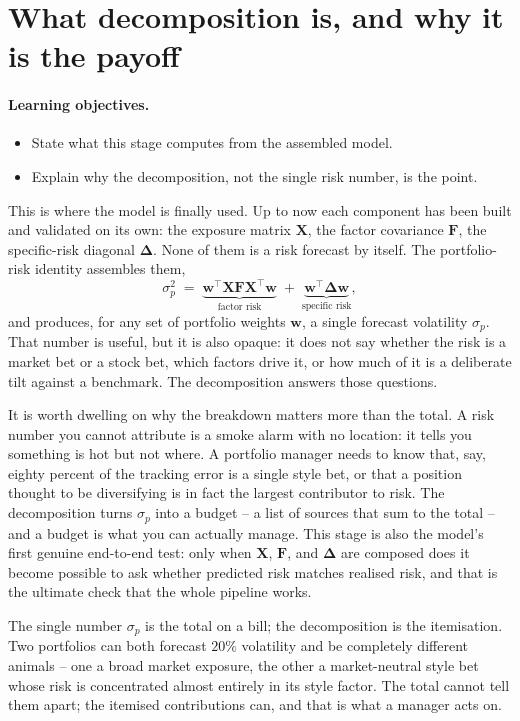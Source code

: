 \documentclass[11pt]{article}
\theoremstyle{definition}
\theoremstyle{plain}
\theoremstyle{remark}
\newcommand{\T}{^{\!\top}}
\newcommand{\wvec}{\mathbf{w}}
\newcommand{\Xmat}{\mathbf{X}}
\newcommand{\Fmat}{\mathbf{F}}
\newcommand{\Del}{\boldsymbol{\Delta}}
\begin{document}
\tableofcontents
\bigskip

\section{What decomposition is, and why it is the payoff}\label{sec:what}

\paragraph{Learning objectives.}
\begin{itemize}[leftmargin=1.4em,topsep=2pt]
  \item State what this stage computes from the assembled model.
  \item Explain why the decomposition, not the single risk number, is the point.
\end{itemize}

This is where the model is finally used. Up to now each component has been built and validated on its own: the exposure matrix $\Xmat$, the factor covariance $\Fmat$, the specific-risk diagonal $\Del$. None of them is a risk forecast by itself. The portfolio-risk identity assembles them,
\[
\sigma_p^2 \;=\; \underbrace{\wvec\T\Xmat\Fmat\Xmat\T\wvec}_{\text{factor risk}} \;+\; \underbrace{\wvec\T\Del\wvec}_{\text{specific risk}},
\]
and produces, for any set of portfolio weights $\wvec$, a single forecast volatility $\sigma_p$. That number is useful, but it is also opaque: it does not say whether the risk is a market bet or a stock bet, which factors drive it, or how much of it is a deliberate tilt against a benchmark. The decomposition answers those questions.

It is worth dwelling on why the breakdown matters more than the total. A risk number you cannot attribute is a smoke alarm with no location: it tells you something is hot but not where. A portfolio manager needs to know that, say, eighty percent of the tracking error is a single style bet, or that a position thought to be diversifying is in fact the largest contributor to risk. The decomposition turns $\sigma_p$ into a budget -- a list of sources that sum to the total -- and a budget is what you can actually manage. This stage is also the model's first genuine end-to-end test: only when $\Xmat$, $\Fmat$, and $\Del$ are composed does it become possible to ask whether predicted risk matches realised risk, and that is the ultimate check that the whole pipeline works.

\begin{intuition}
The single number $\sigma_p$ is the total on a bill; the decomposition is the itemisation. Two portfolios can both forecast $20\%$ volatility and be completely different animals -- one a broad market exposure, the other a market-neutral style bet whose risk is concentrated almost entirely in its style factor. The total cannot tell them apart; the itemised contributions can, and that is what a manager acts on.
\end{intuition}
\end{document}
